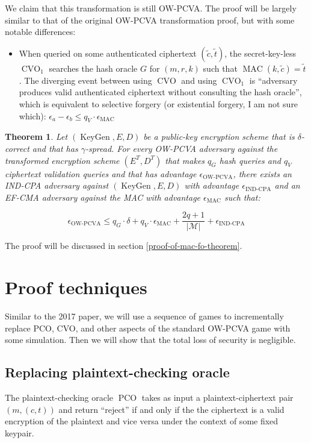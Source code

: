 \documentclass{article}
\newcommand{\norm}[1]{\vert {#1} \vert}
\newcommand{\keygen}{\operatorname{KeyGen}}
\newtheorem{theorem}{Theorem}[section]
\begin{document}
We claim that this transformation is still OW-PCVA. The proof will be largely similar to that of the original OW-PCVA transformation proof, but with some notable differences:

\begin{itemize}
    \item When queried on some authenticated ciphertext $(\tilde{c}, \tilde{t})$, the secret-key-less $\operatorname{CVO}_1$ searches the hash oracle $G$ for $(m, r, k)$ such that $\operatorname{MAC}(k, \tilde{c}) = \tilde{t}$. The diverging event between using $\operatorname{CVO}$ and using $\operatorname{CVO}_1$ is ``adversary produces valid authenticated ciphertext without consulting the hash oracle'', which is equivalent to selective forgery (or existential forgery, I am not sure which): $\epsilon_a - \epsilon_b \leq q_V \cdot \epsilon_\text{MAC}$
\end{itemize}

\begin{theorem}\label{mac-fo-theorem}
    Let $(\keygen, E, D)$ be a public-key encryption scheme that is $\delta$-correct and that has $\gamma$-spread. For every OW-PCVA adversary against the transformed encryption scheme $(E^T, D^T)$ that makes $q_G$ hash queries and $q_V$ ciphertext validation queries and that has advantage $\epsilon_\text{OW-PCVA}$, there exists an IND-CPA adversary against $(\keygen, E, D)$ with advantage $\epsilon_\text{IND-CPA}$ and an EF-CMA adversary against the MAC with advantage $\epsilon_\text{MAC}$ such that:

    \begin{equation*}
        \epsilon_\text{OW-PCVA}
        \leq q_G \cdot \delta 
        + q_V \cdot \epsilon_\text{MAC}
        + \frac{2q+1}{\norm{\mathcal{M}}} 
        + \epsilon_\text{IND-CPA}
    \end{equation*}
\end{theorem}

The proof will be discussed in section \ref{proof-of-mac-fo-theorem}.

\section{Proof techniques}
Similar to the 2017 paper, we will use a sequence of games to incrementally replace PCO, CVO, and other aspects of the standard OW-PCVA game with some simulation. Then we will show that the total loss of security is negligible.

\subsection{Replacing plaintext-checking oracle}\label{replacing-pco}
The plaintext-checking oracle $\operatorname{PCO}$ takes as input a plaintext-ciphertext pair $(m, (c, t))$ and return ``reject'' if and only if the the ciphertext is a valid encryption of the plaintext and vice versa under the context of some fixed keypair.
\end{document}
